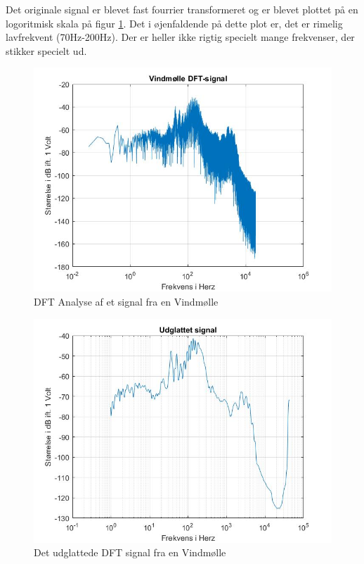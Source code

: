Det originale signal er blevet fast fourrier transformeret og er blevet plottet på en logoritmisk skala på figur \ref{fig:Vind DFT}. Det i øjenfaldende på dette plot er, det er rimelig lavfrekvent (70Hz-200Hz). Der er heller ikke rigtig specielt mange frekvenser, der stikker specielt ud.
\begin{figure}[H]
	\centering
	\includegraphics[width=120mm]{figures/Vind/DFT.jpg}
	\caption{DFT Analyse af et signal fra en Vindmølle}
	\label{fig:Vind DFT}
\end{figure}

\begin{figure}[H]
	\centering
	\includegraphics[width=120mm]{figures/Vind/udglattet.jpg}
	\caption{Det udglattede DFT signal fra en Vindmølle}
	\label{fig:Vind udglattet}
\end{figure}


